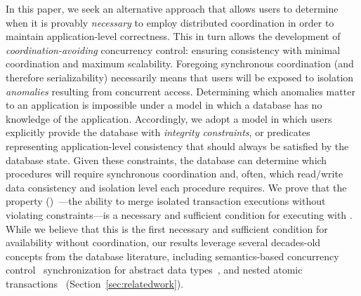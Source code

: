 In this paper, we seek an alternative approach that allows users to
determine when it is provably \textit{necessary} to employ distributed
coordination in order to maintain application-level correctness. This
in turn allows the development of \textit{coordination-avoiding}
concurrency control: ensuring consistency with minimal coordination
and maximum scalability. Foregoing synchronous coordination (and
therefore serializability) necessarily means that users will be
exposed to isolation \textit{anomalies} resulting from concurrent
access. Determining which anomalies matter to an application is
impossible under a model in which a database has no knowledge of the
application. Accordingly, we adopt a model in which users explicitly
provide the database with \textit{integrity constraints}, or
predicates representing application-level consistency that should
always be satisfied by the database state. Given these constraints,
the database can determine which procedures will require synchronous
coordination and, often, which read/write data consistency and
isolation level each procedure requires. We prove that the
\textit{\fullnameconfluence} property
(\iconfluence)~\cite{obs-confluence}---the ability to merge isolated
transaction executions without violating constraints---is a necessary
and sufficient condition for executing with \cfreedom. While we
believe that this is the first necessary and sufficient condition for
availability without coordination, our results leverage several
decades-old concepts from the database literature, including
semantics-based concurrency
control~\cite{sdd1,decomp-semantics,badrinath-semantics,garciamolina-semantics,korth-serializability}
synchronization for abstract data
types~\cite{herlihy-apologizing,weihl-thesis}, and nested atomic
transactions~\cite{atomictransactions}
(Section~\ref{sec:relatedwork}).

